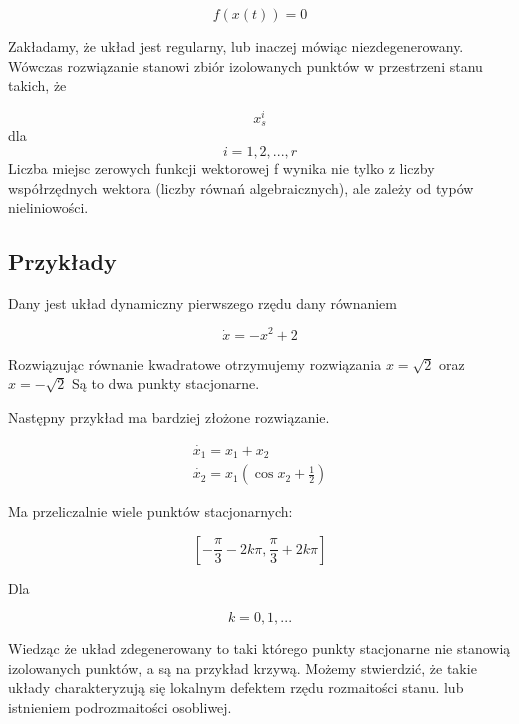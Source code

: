 \documentclass{article}
\begin{document}
	\begin{equation}
		f(x(t)) = 0
	\end{equation}

	Zakładamy, że układ jest regularny, lub inaczej mówiąc niezdegenerowany. Wówczas rozwiązanie stanowi zbiór
	izolowanych punktów w przestrzeni stanu takich, że 

	\begin{equation}
		x_s^i 
	\end{equation}
	dla 
	\begin{equation}
 		i=1,2,..., r
	\end{equation}
	Liczba miejsc zerowych funkcji
	wektorowej f
	wynika nie tylko z liczby współrzędnych wektora (liczby równań
	algebraicznych), ale zależy od typów nieliniowości.
	\subsection{Przykłady}
		Dany jest układ dynamiczny pierwszego rzędu dany równaniem

		\begin{equation}
			\dot{x} = -x^2 + 2
		\end{equation}

		Rozwiązując równanie kwadratowe otrzymujemy rozwiązania
		$x = \sqrt{2}$ oraz $x = -\sqrt{2}$
		Są to dwa punkty stacjonarne.

		Następny przykład ma bardziej złożone rozwiązanie.

		\begin{equation}
			\begin{aligned}
				\dot{x_1} = x_1 + x_2 \\ 
				\dot{x_2} = x_1 \left( \cos{x_2} + \frac{1}{2} \right)
			\end{aligned}
		\end{equation}

		Ma przeliczalnie wiele punktów stacjonarnych:

		\begin{equation}
			\left[ -\frac{\pi}{3} - 2k\pi, \frac{\pi}{3} + 2k\pi \right]
		\end{equation}

		Dla

		\begin{equation}
			k = 0, 1, ...
		\end{equation}
		
		Wiedząc że układ zdegenerowany to taki którego punkty stacjonarne nie 
		stanowią izolowanych punktów, a są na przykład krzywą. Możemy stwierdzić,
		że takie układy charakteryzują się lokalnym defektem rzędu rozmaitości stanu.
		lub istnieniem podrozmaitości osobliwej.
\end{document}

